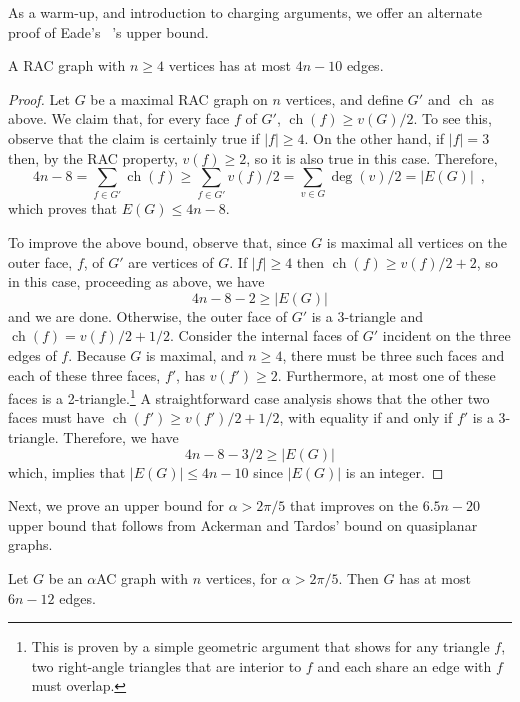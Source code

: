 \documentclass[lotsofwhite,charterfonts]{patmorin}
\DeclareMathOperator{\ch}{ch}
\begin{document}
As a warm-up, and introduction to charging arguments, we offer an alternate
proof of Eade's \etal\ 's upper bound.

\begin{thm}
A RAC graph with $n \ge 4$ vertices has at most $4n-10$ edges.
\end{thm}

\begin{proof}
Let $G$ be a maximal RAC graph on $n$ vertices, and define $G'$ and $\ch$
as above.  We claim that, for every face $f$ of $G'$, $\ch(f)\ge v(G)/2$.
To see this, observe that the claim is certainly true if $|f| \ge 4$.  On
the other hand, if $|f|=3$ then, by the RAC property, $v(f) \ge 2$, so it
is also true in this case.
Therefore,
\[
 4n-8 = \sum_{f\in G'} \ch(f) \ge
 \sum_{f\in G'} v(f)/2 = \sum_{v\in G} \deg(v)/2 = |E(G)| \enspace ,
\]
which proves that $E(G)\le 4n-8$.  

To improve the above bound, observe that, since $G$ is maximal all vertices
on the outer face, $f$, of $G'$ are vertices of $G$.  If $|f| \ge 4$ then
$\ch(f) \ge v(f)/2 + 2$, so in this case, proceeding as above, we have
\[
    4n-8-2 \ge |E(G)| 
\]
and we are done.  Otherwise, the outer face of $G'$ is a 3-triangle and
$\ch(f) = v(f)/2 + 1/2$.  Consider the internal faces of $G'$ incident on
the three edges of $f$.  Because $G$ is maximal, and $n\ge 4$, there must
be three such faces and each of these three faces, $f'$, has $v(f') \ge 2$.
Furthermore, at most one of these faces is a 2-triangle.\footnote{This is
proven by a simple geometric argument that shows for any triangle $f$,
two right-angle triangles that are interior to $f$ and each share an
edge with $f$ must overlap.}
A straightforward case analysis shows that the other
two faces must have $\ch(f') \ge v(f')/2 + 1/2$, with equality if and only
if $f'$ is a 3-triangle.  Therefore, we have
\[
    4n-8-3/2 \ge |E(G)| 
\]
which, implies that $|E(G)| \le 4n-10$ since $|E(G)|$ is an integer.
\end{proof}


Next, we prove an upper bound for $\alpha > 2\pi/5$ that improves on the
$6.5n-20$ upper bound that follows from Ackerman and Tardos' bound on
quasiplanar graphs.

\begin{thm}
Let $G$ be an $\alpha$AC graph with $n$ vertices, for $\alpha > 2\pi/5$.
Then $G$ has at most $6n-12$ edges.
\end{thm}
\end{document}
